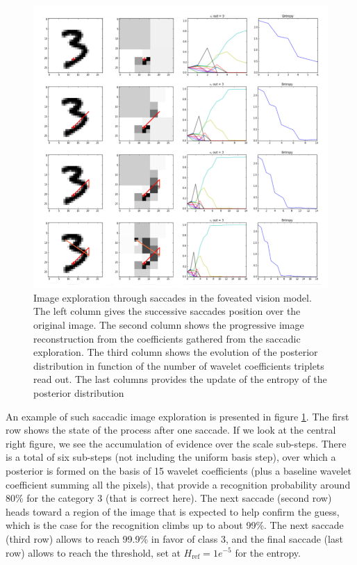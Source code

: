 \documentclass{article} %
\begin{document}
\begin{figure}[t!]
	\centerline{
		\includegraphics[width = .7\linewidth]{img/ICLR-foveated-saccades.png} 
	}
	\caption{Image exploration through saccades in the foveated vision model. The left column gives the successive saccades position over the original image. The second column shows the progressive image reconstruction from the coefficients gathered from the saccadic exploration. The third column shows the evolution of the posterior distribution in function of the number of wavelet coefficients triplets read out. The last columns provides the update of the entropy of the posterior distribution}\label{fig:foveated-saccades}
\end{figure}


An example of such saccadic image exploration is presented in figure \ref{fig:foveated-saccades}.
The first row shows the state of the process after one saccade. If we look at the central right figure, we see the accumulation of evidence over the scale sub-steps. There is a total of six sub-steps (not including the uniform basis step), over which a posterior is formed on the basis of 15 wavelet coefficients (plus a baseline wavelet coefficient summing all the pixels), that provide a recognition probability around 80\% for the category 3 (that is correct here). The next saccade (second row) heads toward a region of the image that is expected to help confirm the guess, which is the case for the recognition climbs up to about 99\%. The next saccade (third row) allows to reach 99.9\% in favor of class 3, and the final saccade (last row) allows to reach the threshold, set at $H_\text{ref} = 1e^{-5}$ for the entropy.   
\end{document}
